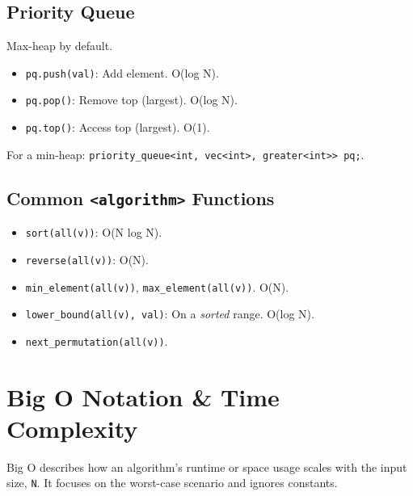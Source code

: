 \documentclass[10pt]{article}
\newcommand{\code}[1]{\texttt{#1}}
\begin{document}
\begin{multicols}{2}
\subsection{Priority Queue}
Max-heap by default.
\begin{itemize}
    \item \code{pq.push(val)}: Add element. O(log N).
    \item \code{pq.pop()}: Remove top (largest). O(log N).
    \item \code{pq.top()}: Access top (largest). O(1).
\end{itemize}
For a min-heap: \code{priority_queue<int, vec<int>, greater<int>> pq;}.

\subsection{Common \texttt{<algorithm>} Functions}
\begin{itemize}
    \item \code{sort(all(v))}: O(N log N).
    \item \code{reverse(all(v))}: O(N).
    \item \code{min_element(all(v))}, \code{max_element(all(v))}. O(N).
    \item \code{lower_bound(all(v), val)}: On a \textit{sorted} range. O(log N).
    \item \code{next_permutation(all(v))}.
\end{itemize}


\newpage
\section{Big O Notation \& Time Complexity}
Big O describes how an algorithm's runtime or space usage scales with the input size, \code{N}. It focuses on the worst-case scenario and ignores constants.


\end{multicols}
\end{document}
